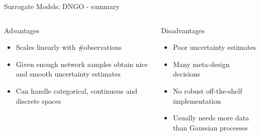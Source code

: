 \begin{frame}[c]{Surrogate Models: DNGO - summary}


\begin{columns}[T] %
\begin{column}{.48\textwidth}

    \begin{block}{Advantages}
    \begin{itemize}
        \item Scales linearly with \#observations 
        \item Given enough network samples obtain nice and smooth uncertainty estimates 
        \item Can handle categorical, continuous and discrete spaces
    \end{itemize}
    \end{block}
\end{column}%

\hfill%
\pause

\begin{column}{.48\textwidth}
    \begin{block}{Disadvantages}
    \begin{itemize}
        \item Poor uncertainty estimates 
        \item Many meta-design decisions 
    	\item No robust off-the-shelf implementation 
    	\item Usually needs more data than Gaussian processes
    \end{itemize}
    \end{block}

\end{column}
\end{columns}

\end{frame}
